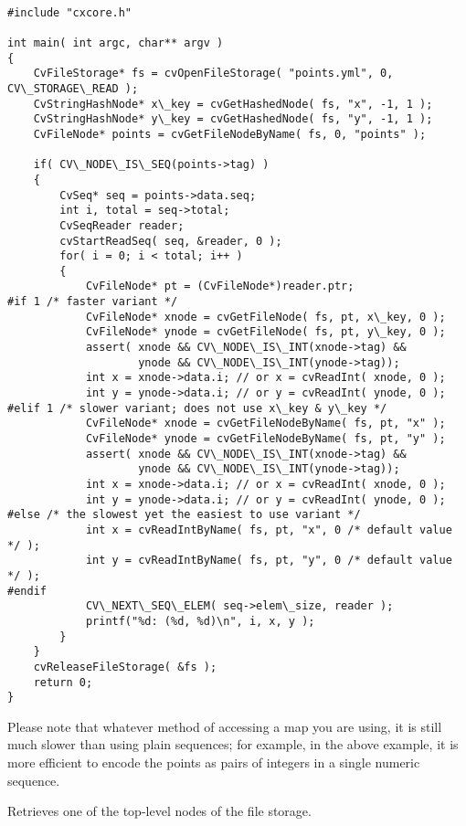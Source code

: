 \begin{lstlisting}

#include "cxcore.h"

int main( int argc, char** argv )
{
    CvFileStorage* fs = cvOpenFileStorage( "points.yml", 0, CV\_STORAGE\_READ );
    CvStringHashNode* x\_key = cvGetHashedNode( fs, "x", -1, 1 );
    CvStringHashNode* y\_key = cvGetHashedNode( fs, "y", -1, 1 );
    CvFileNode* points = cvGetFileNodeByName( fs, 0, "points" );

    if( CV\_NODE\_IS\_SEQ(points->tag) )
    {
        CvSeq* seq = points->data.seq;
        int i, total = seq->total;
        CvSeqReader reader;
        cvStartReadSeq( seq, &reader, 0 );
        for( i = 0; i < total; i++ )
        {
            CvFileNode* pt = (CvFileNode*)reader.ptr;
#if 1 /* faster variant */
            CvFileNode* xnode = cvGetFileNode( fs, pt, x\_key, 0 );
            CvFileNode* ynode = cvGetFileNode( fs, pt, y\_key, 0 );
            assert( xnode && CV\_NODE\_IS\_INT(xnode->tag) &&
                    ynode && CV\_NODE\_IS\_INT(ynode->tag));
            int x = xnode->data.i; // or x = cvReadInt( xnode, 0 );
            int y = ynode->data.i; // or y = cvReadInt( ynode, 0 );
#elif 1 /* slower variant; does not use x\_key & y\_key */
            CvFileNode* xnode = cvGetFileNodeByName( fs, pt, "x" );
            CvFileNode* ynode = cvGetFileNodeByName( fs, pt, "y" );
            assert( xnode && CV\_NODE\_IS\_INT(xnode->tag) &&
                    ynode && CV\_NODE\_IS\_INT(ynode->tag));
            int x = xnode->data.i; // or x = cvReadInt( xnode, 0 );
            int y = ynode->data.i; // or y = cvReadInt( ynode, 0 );
#else /* the slowest yet the easiest to use variant */
            int x = cvReadIntByName( fs, pt, "x", 0 /* default value */ );
            int y = cvReadIntByName( fs, pt, "y", 0 /* default value */ );
#endif
            CV\_NEXT\_SEQ\_ELEM( seq->elem\_size, reader );
            printf("%d: (%d, %d)\n", i, x, y );
        }
    }
    cvReleaseFileStorage( &fs );
    return 0;
}

\end{lstlisting}

Please note that whatever method of accessing a map you are using, it is
still much slower than using plain sequences; for example, in the above
example, it is more efficient to encode the points as pairs of integers
in a single numeric sequence.

Retrieves one of the top-level nodes of the file storage.


